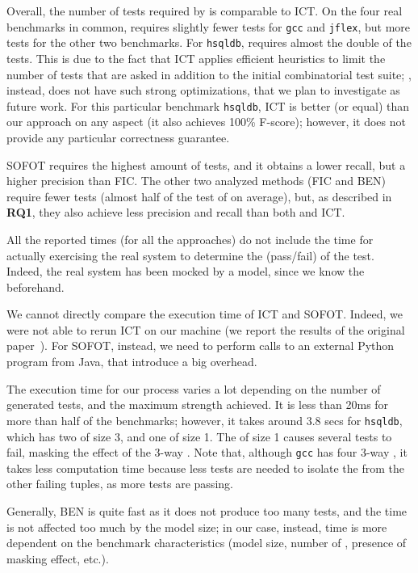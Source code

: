 \begin{tikzborder}{\cite{Gargantini16:validation}}
\begin{tikzborder}{\cite{gargantini_combinatorial_2017}}
\begin{tikzborder}{\cite{garn2019}}
\begin{tikzborder}{\cite{arcaini2019achieving}}
\begin{tikzborder}{}
Overall, the number of tests required by \mix is comparable to ICT. On the four real benchmarks in common, \mix requires slightly fewer tests for \texttt{gcc} and \texttt{jflex}, but more tests for the other two benchmarks. For \texttt{hsqldb}, \mix requires almost the double of the tests. This is due to the fact that ICT applies efficient heuristics to limit the number of tests that are asked in addition to the initial combinatorial test suite; \mix, instead, does not have such strong optimizations, that we plan to investigate as future work. For this particular benchmark \texttt{hsqldb}, ICT is better (or equal) than our approach on any aspect (it also achieves 100\% F-score); however, it does not provide any particular correctness guarantee.

SOFOT requires the highest amount of tests, and it obtains a lower recall, but a higher precision than FIC. The other two analyzed methods (FIC and BEN) require fewer tests (almost half of the test of \mix on average), but, as described in {\bf RQ1}, they also achieve less precision and recall than both \mix and ICT.


All the reported times (for all the approaches) do not include the time for actually exercising the real system to determine the \result (pass/fail) of the test. Indeed, the real system has been mocked by a model, since we know the \truemfics beforehand.

We cannot directly compare the execution time of ICT and SOFOT. Indeed, we were not able to rerun ICT on our machine (we report the results of the original paper~\cite{Niu2018interleaving}). For SOFOT, instead, we need to perform calls to an external Python program from Java, that introduce a big overhead.

The execution time for our process varies a lot depending on the number of generated tests, and the maximum strength achieved. It is less than 20ms for more than half of the benchmarks; however, it takes around 3.8 secs for \texttt{hsqldb}, which has two \truemfics of size 3, and one of size 1. The \mfic of size 1 causes several tests to fail, masking the effect of the 3-way \mfics. Note that, although \texttt{gcc} has four 3-way \truemfics, it takes less computation time because less tests are needed to isolate the \mfics from the other failing tuples, as more tests are passing.

Generally, BEN is quite fast as it does not produce too many tests, and the time is not affected too much by the model size; in our case, instead, time is more dependent on the benchmark characteristics (model size, number of \truemfics, presence of masking effect, etc.).


\end{tikzborder}
\end{tikzborder}
\end{tikzborder}
\end{tikzborder}
\end{tikzborder}

